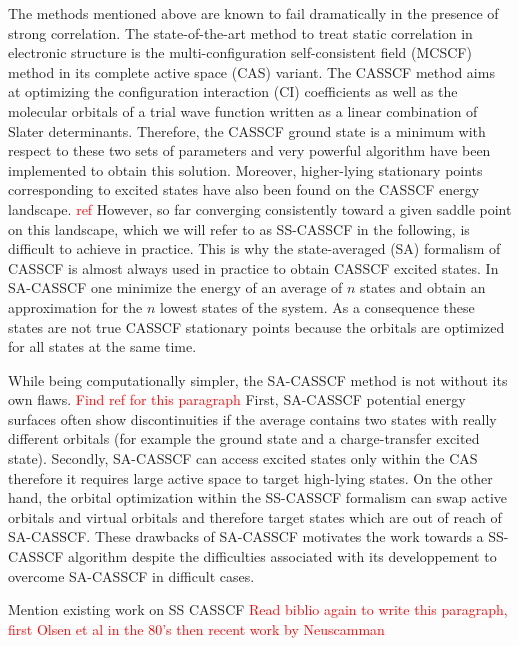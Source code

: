 \documentclass[aps,prb,reprint,showkeys,superscriptaddress]{revtex4-1}
\newcommand{\todo}[1]{\textcolor{red}{#1}}
\begin{document}
The methods mentioned above are known to fail dramatically in the presence of strong correlation. \cite{Jensen_2017}
The state-of-the-art method to treat static correlation in electronic structure is the multi-configuration self-consistent field (MCSCF) method in its complete active space (CAS) variant. \cite{Roos_2016}
The CASSCF method aims at optimizing the configuration interaction (CI) coefficients as well as the molecular orbitals of a trial wave function written as a linear combination of Slater determinants. \cite{Helgaker_2000,Roos_2016}
Therefore, the CASSCF ground state is a minimum with respect to these two sets of parameters and very powerful algorithm have been implemented to obtain this solution. \cite{Roos_1980,Werner_1985,Sun_2017,Kreplin_2019,Kreplin_2020}
Moreover, higher-lying stationary points corresponding to excited states have also been found on the CASSCF energy landscape. \todo{ref}
However, so far converging consistently toward a given saddle point on this landscape, which we will refer to as SS-CASSCF in the following, is difficult to achieve in practice.
This is why the state-averaged (SA) formalism of CASSCF is almost always used in practice to obtain CASSCF excited states.
In SA-CASSCF one minimize the energy of an average of $n$ states and obtain an approximation for the $n$ lowest states of the system.
As a consequence these states are not true CASSCF stationary points because the orbitals are optimized for all states at the same time.

While being computationally simpler, the SA-CASSCF method is not without its own flaws. \todo{Find ref for this paragraph}
First, SA-CASSCF potential energy surfaces often show discontinuities if the average contains two states with really different orbitals (for example the ground state and a charge-transfer excited state).
Secondly, SA-CASSCF can access excited states only within the CAS therefore it requires large active space to target high-lying states.
On the other hand, the orbital optimization within the SS-CASSCF formalism can swap active orbitals and virtual orbitals and therefore target states which are out of reach of SA-CASSCF.
These drawbacks of SA-CASSCF motivates the work towards a SS-CASSCF algorithm despite the difficulties associated with its developpement to overcome SA-CASSCF in difficult cases.

\textsection Mention existing work on SS CASSCF \todo{Read biblio again to write this paragraph, first Olsen et al in the 80's then recent work by Neuscamman \etal} \cite{Golab_1983,Golab_1985,Olsen_1982,Olsen_1983,Rizzo_1990,Guihery_1997,Angeli_2003,Tran_2019,Tran_2020,Hanscam_2021}
\end{document}
